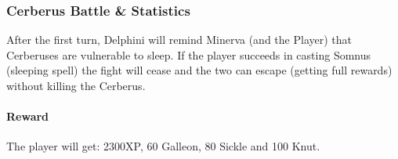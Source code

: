 \subsubsection{Cerberus Battle \& Statistics}

After the first turn, Delphini will remind Minerva (and the Player) that Cerberuses are vulnerable to sleep. If the player succeeds in casting Somnus (sleeping spell) the fight will cease and the two can escape (getting full rewards) without killing the Cerberus.

\paragraph{Reward} The player will get: 2300XP, 60 Galleon, 80 Sickle and 100 Knut.


